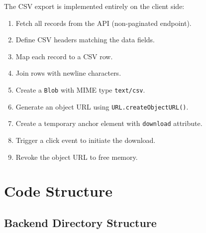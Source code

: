 The CSV export is implemented entirely on the client side:

\begin{enumerate}
  \item Fetch all records from the API (non-paginated endpoint).
  \item Define CSV headers matching the data fields.
  \item Map each record to a CSV row.
  \item Join rows with newline characters.
  \item Create a \texttt{Blob} with MIME type \texttt{text/csv}.
  \item Generate an object URL using \texttt{URL.createObjectURL()}.
  \item Create a temporary anchor element with \texttt{download} attribute.
  \item Trigger a click event to initiate the download.
  \item Revoke the object URL to free memory.
\end{enumerate}

\section{Code Structure}

\subsection{Backend Directory Structure}

